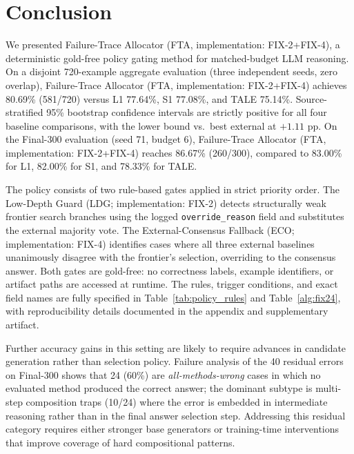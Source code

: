 \section{Conclusion}
\label{sec:conclusion}

We presented Failure-Trace Allocator (FTA, implementation: FIX-2+FIX-4), a deterministic gold-free policy gating method for
matched-budget LLM reasoning.
On a disjoint 720-example aggregate evaluation (three independent seeds, zero overlap),
Failure-Trace Allocator (FTA, implementation: FIX-2+FIX-4) achieves 80.69\% (581/720) versus L1 77.64\%, S1 77.08\%, and TALE 75.14\%.
Source-stratified 95\% bootstrap confidence intervals are strictly positive for all four
baseline comparisons, with the lower bound vs.\ best external at $+1.11$ pp.
On the Final-300 evaluation (seed 71, budget 6), Failure-Trace Allocator (FTA, implementation: FIX-2+FIX-4) reaches 86.67\% (260/300),
compared to 83.00\% for L1, 82.00\% for S1, and 78.33\% for TALE.

The policy consists of two rule-based gates applied in strict priority order.
The Low-Depth Guard (LDG; implementation: FIX-2) detects structurally weak frontier search branches using the
logged \texttt{override\_reason} field and substitutes the external majority vote.
The External-Consensus Fallback (ECO; implementation: FIX-4) identifies cases where all three external
baselines unanimously disagree with the frontier's selection, overriding to the
consensus answer.
Both gates are gold-free: no correctness labels, example identifiers, or artifact
paths are accessed at runtime.
The rules, trigger conditions, and exact field names are fully specified in
Table~\ref{tab:policy_rules} and Table~\ref{alg:fix24}, with reproducibility
details documented in the appendix and supplementary artifact.

Further accuracy gains in this setting are likely to require advances in candidate
generation rather than selection policy.
Failure analysis of the 40 residual errors on Final-300 shows that 24 (60\%) are
\textit{all-methods-wrong} cases in which no evaluated method produced the correct answer;
the dominant subtype is multi-step composition traps (10/24) where the error is
embedded in intermediate reasoning rather than in the final answer selection step.
Addressing this residual category requires either stronger base generators or
training-time interventions that improve coverage of hard compositional patterns.
